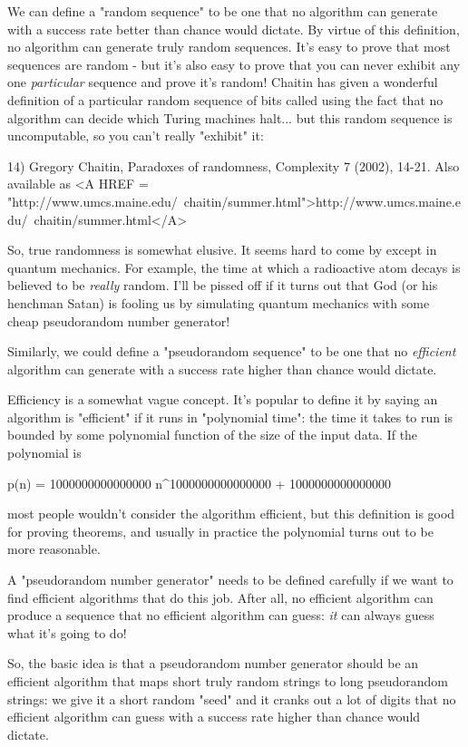 We can define a "random sequence" to be one that no algorithm can generate
with a success rate better than chance would dictate.  By virtue of this
definition, no algorithm can generate truly random sequences.  
It's easy to prove that most sequences are random - but it's also
easy to prove that you can never exhibit any one \emph{particular} sequence
and prove it's random!  Chaitin has given a wonderful definition of a particular
random sequence of bits called \Omega  using the fact that no algorithm 
can decide which Turing machines halt... but this random sequence is 
uncomputable, so you can't really "exhibit" it:

14) Gregory Chaitin, Paradoxes of randomness, Complexity 7 (2002), 14-21.
Also available as <A HREF = "http://www.umcs.maine.edu/~chaitin/summer.html">http://www.umcs.maine.edu/~chaitin/summer.html</A>

So, true randomness is somewhat elusive.  It seems hard to come by except 
in quantum mechanics.  For example, the time at which a radioactive 
atom decays is believed to be \emph{really} random.  I'll be pissed off if 
it turns out that God (or his henchman Satan) is fooling us by simulating 
quantum mechanics with some cheap pseudorandom number generator!

Similarly, we could define a "pseudorandom sequence" to be one that no 
\emph{efficient} algorithm can generate with a success rate higher 
than chance would dictate.  

Efficiency is a somewhat vague concept.   It's popular to define it by
saying an algorithm is "efficient" if it runs in "polynomial time": the 
time it takes to run is bounded by some polynomial function of the 
size of the input data.  If the polynomial is

p(n) = 1000000000000000 n^{1000000000000000} + 1000000000000000 

most people wouldn't consider the algorithm efficient, but this definition
is good for proving theorems, and usually in practice the polynomial
turns out to be more reasonable.

A "pseudorandom number generator" needs to be defined carefully if
we want to find efficient algorithms that do this job.  After all,
no efficient algorithm can produce a sequence that no efficient 
algorithm can guess: \emph{it} can always guess what it's going to do! 

So, the basic idea is that a pseudorandom number generator should be
an efficient algorithm that maps short truly random strings to long
pseudorandom strings: we give it a short random "seed" and it cranks
out a lot of digits that no efficient algorithm can guess with a
success rate higher than chance would dictate.

